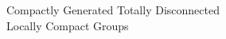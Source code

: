 \documentclass[preview]{standalone}
\begin{document}
\begin{center}
Compactly Generated Totally Disconnected \\ Locally Compact Groups
\end{center}
\end{document}
